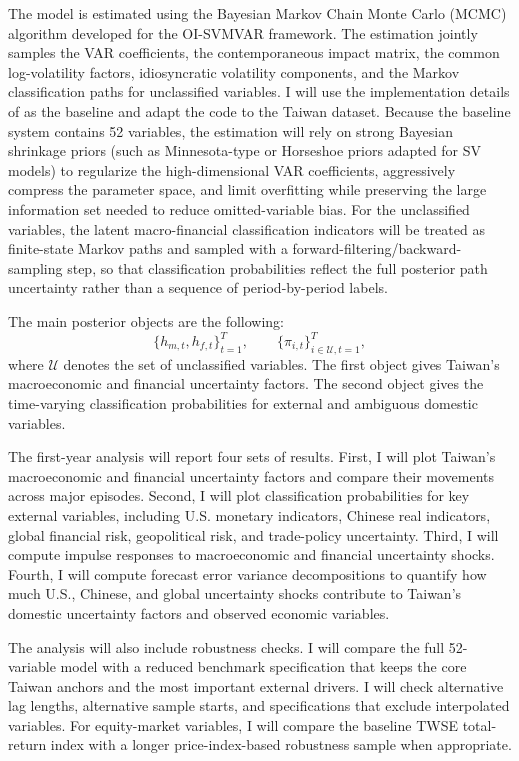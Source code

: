 \documentclass[12pt]{article}
\begin{document}
The model is estimated using the Bayesian Markov Chain Monte Carlo (MCMC) algorithm
developed for the OI-SVMVAR framework. The estimation jointly samples the VAR coefficients, the contemporaneous impact
matrix, the common log-volatility factors, idiosyncratic volatility components, and the Markov
classification paths for unclassified variables. I will use the implementation details of
\citet{davidson2025investigating} as the baseline and adapt the code to the Taiwan dataset.
Because the baseline system contains 52 variables, the estimation will rely on strong Bayesian shrinkage priors (such as Minnesota-type or Horseshoe priors adapted for SV models) to regularize the high-dimensional VAR coefficients, aggressively compress the parameter space, and limit overfitting while preserving the large information set needed to reduce omitted-variable
bias.
For the unclassified variables, the latent macro-financial classification indicators will be treated
as finite-state Markov paths and sampled with a forward-filtering/backward-sampling step, so that
classification probabilities reflect the full posterior path uncertainty rather than a sequence of
period-by-period labels.

The main posterior objects are the following:
\[
\{h_{m,t},h_{f,t}\}_{t=1}^{T},
\qquad
\{\pi_{i,t}\}_{i\in \mathcal{U},t=1}^{T},
\]
where $\mathcal{U}$ denotes the set of unclassified variables. The first object gives Taiwan's
macroeconomic and financial uncertainty factors. The second object gives the time-varying
classification probabilities for external and ambiguous domestic variables.

The first-year analysis will report four sets of results. First, I will plot Taiwan's macroeconomic
and financial uncertainty factors and compare their movements across major episodes. Second, I
will plot classification probabilities for key external variables, including U.S. monetary indicators,
Chinese real indicators, global financial risk, geopolitical risk, and trade-policy uncertainty. Third,
I will compute impulse responses to macroeconomic and financial uncertainty shocks. Fourth, I
will compute forecast error variance decompositions to quantify how much U.S., Chinese, and
global uncertainty shocks contribute to Taiwan's domestic uncertainty factors and observed
economic variables.

The analysis will also include robustness checks. I will compare the full 52-variable model with a
reduced benchmark specification that keeps the core Taiwan anchors and the most important
external drivers. I will check alternative lag lengths, alternative sample starts, and specifications
that exclude interpolated variables. For equity-market variables, I will compare the baseline
TWSE total-return index with a longer price-index-based robustness sample when appropriate.
\end{document}
